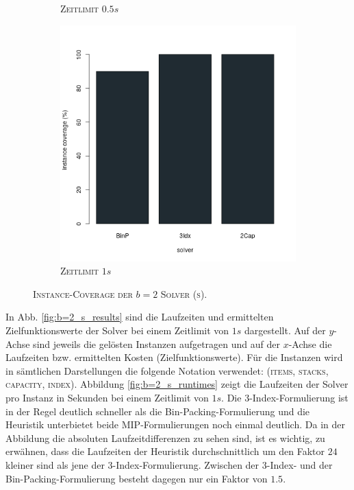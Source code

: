 \begin{figure}[H]
\begin{subfigure}[b]{0.3\textwidth}
\caption{\textsc{Zeitlimit $0.5s$}}
\label{fig:instance_cov_b=2_s_b}
\end{subfigure}
\hfill
\begin{subfigure}[b]{0.3\textwidth}
\centering
\includegraphics[width=1.1\textwidth]{img/solver_instance_coverage_b=2_s_1s.png}
\caption{\textsc{Zeitlimit $1s$}}
\label{fig:instance_cov_b=2_s_c}
\end{subfigure}

\caption{\textsc{Instance-Coverage der $b=2$ Solver (s)}.}
\label{fig:instance_cov_b=2_s}
\end{figure}

In Abb. \ref{fig:b=2_s_results} sind die Laufzeiten und ermittelten Zielfunktionswerte der Solver bei einem Zeitlimit von $1s$ dargestellt. Auf der $y$-Achse sind jeweils die gelösten Instanzen aufgetragen und auf der $x$-Achse die Laufzeiten bzw. ermittelten Kosten (Zielfunktionswerte). Für die Instanzen wird in sämtlichen Darstellungen die folgende Notation verwendet: (\textsc{items, stacks, capacity, index}). Abbildung \ref{fig:b=2_s_runtimes} zeigt die Laufzeiten der Solver pro Instanz in Sekunden bei einem Zeitlimit von $1s$.
Die 3-Index-Formulierung ist in der Regel deutlich schneller als die Bin-Packing-Formulierung und die Heuristik unterbietet beide MIP-Formulierungen noch einmal deutlich. Da in der Abbildung die absoluten Laufzeitdifferenzen zu sehen sind, ist es wichtig, zu erwähnen, dass die Laufzeiten der Heuristik durchschnittlich um den Faktor $24$ kleiner sind als jene der 3-Index-Formulierung. Zwischen der 3-Index- und der Bin-Packing-Formulierung besteht dagegen nur ein Faktor von $1.5$.

